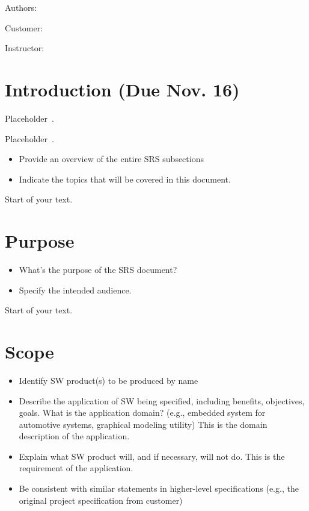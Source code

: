 \documentclass[12pt]{article}
\begin{document}
Authors:

Customer:

Instructor:

\section{{}{Introduction (Due Nov. 16)}}\label{introduction-due-nov.-16}

Placeholder~\cite{alaettinoglurfc}.

Placeholder~\cite{blunk2005rfc}.

\begin{itemize}
\item
  Provide an overview of the entire SRS subsections
\item
  Indicate the topics that will be covered in this document.
\end{itemize}

Start of your text.

\section{Purpose}\label{purpose}

\begin{itemize}
\item
  What's the purpose of the SRS document?
\item
  Specify the intended audience.
\end{itemize}

Start of your text.

\section{Scope}\label{scope}

\begin{itemize}
\item
  Identify SW product(s) to be produced by name
\item
  Describe the application of SW being specified, including benefits,
  objectives, goals. What is the application domain? (e.g., embedded
  system for automotive systems, graphical modeling utility) This is the
  domain description of the application.
\item
  Explain what SW product will, and if necessary, will not do. This is
  the requirement of the application.
\item
  Be consistent with similar statements in higher-level specifications
  (e.g., the original project specification from customer)
\end{itemize}
\end{document}
